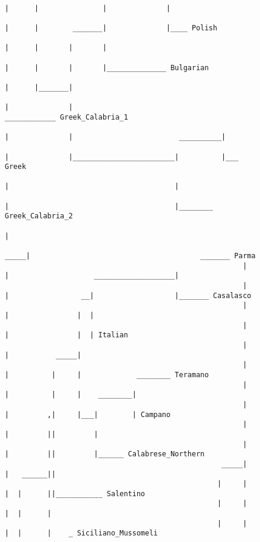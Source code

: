 \begin{figure}[H]
\begin{center}
{\begin{verbatim}
                                                              |      |               |              |
                                                              |      |        _______|              |____ Polish
                                                              |      |       |       |
                                                              |      |       |       |______________ Bulgarian
                                                              |      |_______|
                                                              |              |                                    ____________ Greek_Calabria_1
                                                              |              |                         __________|
                                                              |              |________________________|          |___ Greek
                                                              |                                       |
                                                              |                                       |________ Greek_Calabria_2
                                                              |
                                                         _____|                                        _______ Parma
                                                        |     |                    ___________________|
                                                        |     |                 __|                   |_______ Casalasco
                                                        |     |                |  |
                                                        |     |                |  | Italian
                                                        |     |           _____|
                                                        |     |          |     |             ________ Teramano
                                                        |     |          |     |    ________|
                                                        |     |         ,|     |___|        | Campano
                                                        |     |         ||         |
                                                        |     |         ||         |______ Calabrese_Northern
                                                   _____|     |   ______||
                                                  |     |     |  |      ||___________ Salentino
                                                  |     |     |  |      |
                                                  |     |     |  |      |    _ Siciliano_Mussomeli

\end{verbatim}}
\end{center}
\end{figure}
